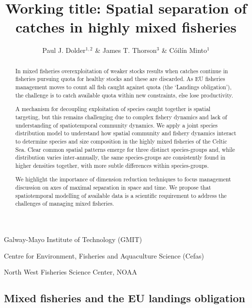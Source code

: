 \documentclass{nature}
\title{Working title: Spatial separation of catches in highly mixed fisheries}
\author{Paul J. Dolder$^{1,2}$ \& James T. Thorson$^3$ \& Cóilín Minto$^1$}
\begin{document}
\maketitle

\begin{affiliations}
\item Galway-Mayo Institute of Technology (GMIT) 
\item Centre for Environment, Fisheries and Aquaculture Science (Cefas)
\item North West Fisheries Science Center, NOAA
\end{affiliations}

\begin{linenumbers}

\begin{abstract} 
In mixed fisheries overexploitation of weaker stocks results when catches
continue in fisheries pursuing quota for healthy stocks and these are
discarded. As EU fisheries management moves to count all fish caught against
quota (the `Landings obligation'), the challenge is to catch available quota
within new constraints, else lose productivity.  

A mechanism for decoupling exploitation of species caught together is spatial
targeting, but this remains challenging due to complex fishery dynamics and
lack of understanding of spatiotemporal community dynamics. We apply a joint
species distribution model to understand how spatial community and fishery
dynamics interact to determine species and size composition in the highly mixed
fisheries of the Celtic Sea. Clear common spatial patterns emerge for three
distinct species-groups and, while distribution varies inter-annually, the same
species-groups are consistently found in higher densities together, with more
subtle differences within species-groups.

We highlight the importance of dimension reduction techniques to focus
management discussion on axes of maximal separation in space and time. We
propose that spatiotemporal modelling of available data is a scientific
requirement to address the challenges of managing mixed fisheries.  
\end{abstract}

\section*{}
\subsection{Mixed fisheries and the EU landings obligation} 


\end{linenumbers}
\end{document}
